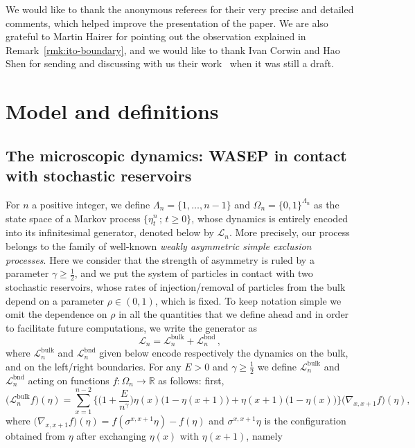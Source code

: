 \documentclass[10pt]{amsart}
\theoremstyle{definition}\newtheorem{defi}[theo]{Definition}\newtheorem{rema}[theo]{Remark}\newtheorem{exam}[theo]{Example}\newtheorem{exem}[theo]{Example}\newtheorem{nota}[theo]{Notation}
\DeclareMathOperator{\bulk}{bulk}
\newcommand{\bb}[1]{{\mathbb #1}}
\newcommand{\mc}[1]{{\mathcal #1}}
\renewcommand{\mc}[1]{{\mathcal #1}}
\renewcommand{\geq}{\geqslant}
\begin{document}
We would like to thank the anonymous referees for their very precise and detailed comments, which helped improve the presentation of the paper. We are also grateful to Martin Hairer for pointing out the observation explained in Remark~\ref{rmk:ito-boundary}, and we would like to thank Ivan Corwin and Hao Shen for sending and discussing with us their work~\cite{Corwin2016} when it was still a draft.


\section{Model and definitions}\label{s2}

\subsection{The microscopic dynamics: WASEP in contact with stochastic reservoirs} For $n$ a positive integer, we define $\Lambda_n = \{1,\ldots, n-1\}$ and $\Omega_n=\{0,1\}^{\Lambda_n}$ as the state space of a Markov process $\{\eta_t^n\,; \, t \geq 0\}$, whose dynamics is entirely encoded into its infinitesimal generator, denoted below by $\mc L_n$. More precisely, our process belongs to the family of well-known \emph{weakly asymmetric simple exclusion processes}. Here we consider that the strength of asymmetry is ruled by a parameter $\gamma \geq \frac12$, and we put the system of particles in contact with two stochastic reservoirs, whose rates of injection/removal of particles from the bulk depend on a parameter $\rho\in{(0,1)}$, which is fixed. To keep notation simple we omit the dependence on $\rho$ in all the quantities that we define ahead and in order to facilitate future computations, we write the generator as
\begin{equation*}
\mathcal L_n = \mc L_n^{\bulk} + \mc L_n^{\mathrm{bnd}}\,,
\end{equation*}
where $\mc L_n^{\bulk}$ and $\mc L_n^{\mathrm{bnd}}$ given below encode respectively the dynamics on the bulk, and on the left/right boundaries. For any $E>0$ and $\gamma\geq \frac12$ we define $\mc L_n^{\bulk}$ and $\mc L_n^{\mathrm{bnd}}$ acting on functions $f: \Omega_n \to \bb R$ as follows: first,
\begin{equation*}
\big(\mc L_n^{\bulk} f\big)(\eta) =
\sum_{x=1}^{n-2} \bigg\{\bigg(1+\frac{E}{n^\gamma} \bigg) \eta(x)\big(1-\eta(x+1)\big)+\eta(x+1)\big(1-\eta(x)\big)\bigg\} \big(\nabla_{x,x+1}f\big)(\eta),
\end{equation*}
where $\big(\nabla_{x,x+1}f\big)(\eta)=f(\sigma^{x,x+1}\eta) -f(\eta)$ and $\sigma^{x,x+1} \eta$ is the configuration obtained from $\eta$ after exchanging $\eta(x)$ with $\eta(x+1)$, namely
\end{document}
